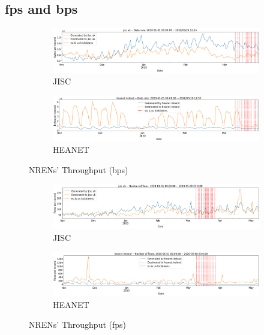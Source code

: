 \documentclass[10pt, journal, letterpaper]{IEEEtran}
\begin{document}
\subsection{fps and bps}
\begin{figure}
    \begin{subfigure}{\textwidth}
          \centering
          \includegraphics[width=\columnwidth]{img/jisc_bps.png}
          \caption{JISC}
          \label{fig:jisc_bps}
    \end{subfigure}
    \begin{subfigure}{\textwidth}
          \centering
          \includegraphics[width=\columnwidth]{img/heanet_bps.png}
          \caption{HEANET}
          \label{fig:HEANET_bps}
    \end{subfigure}
    \caption{NRENs' Throughput (bps)}
    \label{fig:nrens_bps}
\end{figure}

\begin{figure}
    \begin{subfigure}{\textwidth}
          \centering
          \includegraphics[width=\columnwidth]{img/jisc_fps.png}
          \caption{JISC}
          \label{fig:jisc_fps}
    \end{subfigure}
    \begin{subfigure}{\textwidth}
          \centering
          \includegraphics[width=\columnwidth]{img/heanet_fps.png}
          \caption{HEANET}
          \label{fig:HEANET_fps}
    \end{subfigure}
    \caption{NRENs' Throughput (fps)}
    \label{fig:nrens_fps}
\end{figure}
\end{document}
